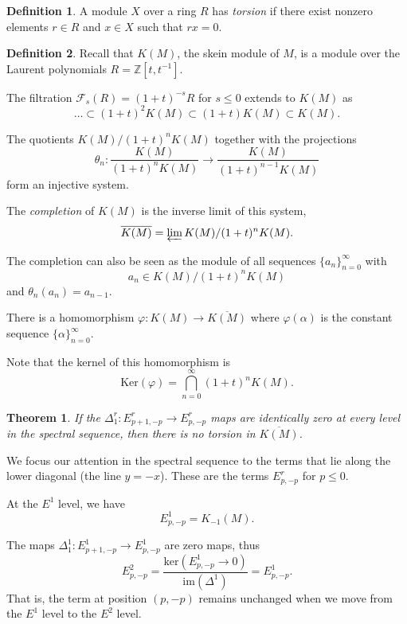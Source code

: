 \documentclass{slides}
\newtheorem{theorem}{Theorem}
\theoremstyle{definition}
\newtheorem*{definition}{Definition}
\begin{document}
\begin{slide}
\begin{definition}
A module $X$ over a ring $R$ has \textit{torsion} if there
exist nonzero elements $r \in R$ and $x \in X$ such that
$rx = 0$.
\end{definition}
\end{slide}

\begin{slide}
\begin{definition}
Recall that $K(M)$, the skein module
of $M$, is a module over the Laurent polynomials
$R=\mathbb{Z}[t,t^{-1}]$.

The filtration $\mathcal{F}_s(R) = (1+t)^{-s} R$ for $s \leq 0$
extends to $K(M)$ as
\[
\dots \subset (1+t)^2 K(M) \subset (1+t) K(M)
\subset K(M).
\]

The quotients $K(M) / (1+t)^n K(M)$ together with the projections
$$\theta_n : \frac{K(M)}{(1+t)^n K(M)} \to \frac{K(M)}{(1+t)^{n-1} K(M)}$$ form an
injective system.

The \textit{completion} of $K(M)$ is the inverse limit of this system,
\[
\overline{K(M)} = \varprojlim K(M) / (1+t)^n K(M).
\]

The completion can also be seen as the module of all sequences
$\{ a_n \}_{n=0}^{\infty}$ with
$$a_n \in K(M) / (1+t)^n K(M)$$ and $\theta_n(a_n) = a_{n-1}$.

There is a homomorphism $\varphi : K(M) \to \overline{K(M)}$ where
$\varphi ( \alpha)$ is the constant sequence $\{ \alpha \}_{n=0}^{\infty}$.

Note that the kernel of this homomorphism is
\[
\mathrm{Ker}(\varphi) = \bigcap_{n=0}^{\infty}(1+t)^n K(M).
\]
\end{definition}
\end{slide}

\begin{slide}
\begin{theorem}
If the $\Delta^r_1: E^r_{p+1,-p} \to E^r_{p,-p}$ maps are identically zero
at every level in the spectral sequence, then there is
no torsion in $\overline{K(M)}$.
\label{thm-zero-maps}
\end{theorem}

\proof
We focus our attention in the spectral sequence to the terms
that lie along the lower diagonal (the line $y=-x$).  These
are the terms $E^r_{p,-p}$ for $p \leq 0$.

At the $E^1$ level, we have
\[
E^1_{p,-p} = K_{-1}(M).
\]

The maps $\Delta^1_1 : E^1_{p+1,-p} \to E^1_{p,-p}$ are zero
maps, thus
\[E^2_{p,-p} =
\frac{\mathrm{ker}(E^1_{p,-p} \to 0)} {\mathrm{im}(\Delta^1)} = 
E^1_{p,-p}.
\]
That is, the term at position $(p,-p)$ remains unchanged
when we move from the $E^1$ level to the $E^2$ level.
\end{slide}
\end{document}

